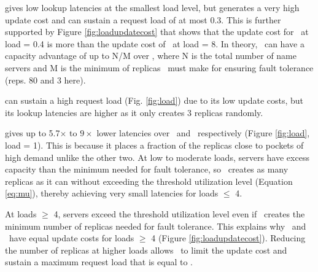 {\em{\replicateall}}   gives low lookup latencies at the smallest load level, but generates a very high update cost and can sustain a request load of at most 0.3. This is further supported by  Figure \ref{fig:loadupdatecost} that shows that the update cost for \replicateall\ at load = 0.4 is more than the update cost of \auspice\  at load = 8. In theory, \auspice\ can have a capacity advantage of up to N/M over \replicateall, where N is the total number of name servers and M is the minimum of replicas \auspice\ must make for ensuring fault tolerance (reps. 80 and 3 here).


{\em{\staticthree}} can sustain a high request load (Fig. \ref{fig:load}) due to its low update costs, but its lookup latencies are higher as it only creates 3 replicas randomly. %

{\em{\auspice}}  gives up to 5.7$\times$ to $9\times$ lower latencies over \staticthree\ and \codons\ respectively (Figure \ref{fig:load}, load = 1). This is because it places a fraction of the replicas close to pockets of high demand unlike the other two.  At low to moderate loads, servers have excess capacity than the minimum needed for fault tolerance, so \auspice\ creates as many replicas as it can without exceeding the threshold utilization level (Equation \ref{eq:mu}), thereby  achieving very small latencies for loads $\leq$ 4. 



At loads $\geq$ 4, servers exceed the threshold utilization level even if \auspice\ creates the minimum number of replicas needed for fault tolerance. This explains why \auspice\ and \staticthree\ have equal update costs for loads $\geq$ 4 (Figure \ref{fig:loadupdatecost}). Reducing the number of replicas at higher loads allows \auspice\ to limit the update cost and sustain a maximum request load that is equal to \staticthree. 

